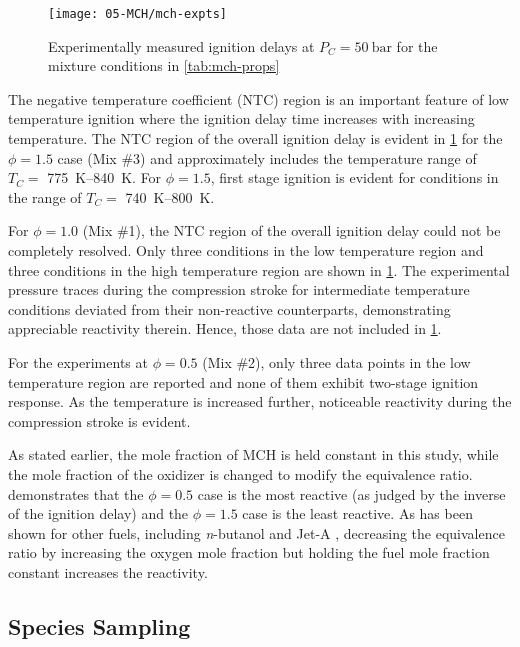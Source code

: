 \documentclass[../main.tex]{subfiles}
\begin{document}
\begin{figure}
    \texttt{[image: 05-MCH/mch-expts]}
    \caption{Experimentally measured ignition delays at $P_C=\SI{50}{\bar}$ for the
    mixture conditions in \cref{tab:mch-props}}
    \label{fig:mch-expts}
\end{figure}

The negative temperature coefficient (NTC) region is an important feature of
low temperature ignition where the ignition delay time increases with
increasing temperature. The NTC region of the overall ignition delay is
evident in \cref{fig:mch-expts} for the $\phi=\num{1.5}$ case (Mix \#3) and
approximately includes the temperature range of $T_C=$ \SIrange{775}{840}{\kelvin}. For
$\phi=\num{1.5}$, first stage ignition is evident for conditions in the range of
$T_C=$ \SIrange{740}{800}{\kelvin}.

For $\phi=\num{1.0}$ (Mix \#1), the NTC region of the overall ignition delay could
not be completely resolved. Only three conditions in the low temperature region
and three conditions in the high temperature region are shown in
\cref{fig:mch-expts}. The experimental pressure traces during the compression
stroke for intermediate temperature conditions deviated from their
non-reactive counterparts, demonstrating appreciable reactivity therein. Hence,
those data are not included in \cref{fig:mch-expts}.

For the experiments at $\phi=\num{0.5}$ (Mix \#2), only three data points in the low
temperature region are reported and none of them exhibit two-stage ignition
response. As the temperature is increased further, noticeable reactivity during
the compression stroke is evident.

As stated earlier, the mole fraction of MCH is held constant in this study,
while the mole fraction of the oxidizer is changed to modify the equivalence
ratio.  demonstrates that the $\phi=\num{0.5}$ case is the most
reactive (as judged by the inverse of the ignition delay) and the $\phi=\num{1.5}$
case is the least reactive. As has been shown for other fuels, including
\textit{n}-butanol \cite{Weber2011} and Jet-A \cite{Kumar2010}, decreasing the
equivalence ratio by increasing the oxygen mole fraction but holding the fuel
mole fraction constant increases the reactivity.

\subsection{Species Sampling}
\label{sec:mch-sampling}
\end{document}
